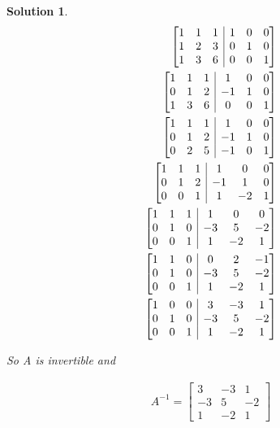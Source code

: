 \documentclass{article}
\newtheorem*{solution}{Solution}
\begin{document}
\begin{solution}
\begin{align*}
\left[ \begin{array}{@{}ccc|ccc@{}}
1 & 1 & 1 & 1 & 0 & 0 \\
1 & 2 & 3 & 0 & 1 & 0 \\
1 & 3 & 6 & 0 & 0 & 1
\end{array} \right] \\
\left[ \begin{array}{@{}ccc|ccc@{}}
1 & 1 & 1 & 1 & 0 & 0 \\
0 & 1 & 2 & -1 & 1 & 0 \\
1 & 3 & 6 & 0 & 0 & 1
\end{array} \right] \\
\left[ \begin{array}{@{}ccc|ccc@{}}
1 & 1 & 1 & 1 & 0 & 0 \\
0 & 1 & 2 & -1 & 1 & 0 \\
0 & 2 & 5 & -1 & 0 & 1
\end{array} \right] \\
\left[ \begin{array}{@{}ccc|ccc@{}}
1 & 1 & 1 & 1 & 0 & 0 \\
0 & 1 & 2 & -1 & 1 & 0 \\
0 & 0 & 1 & 1 & -2 & 1
\end{array} \right] \\
\left[ \begin{array}{@{}ccc|ccc@{}}
1 & 1 & 1 & 1 & 0 & 0 \\
0 & 1 & 0 & -3 & 5 & -2 \\
0 & 0 & 1 & 1 & -2 & 1
\end{array} \right] \\
\left[ \begin{array}{@{}ccc|ccc@{}}
1 & 1 & 0 & 0 & 2 & -1 \\
0 & 1 & 0 & -3 & 5 & -2 \\
0 & 0 & 1 & 1 & -2 & 1
\end{array} \right] \\
\left[ \begin{array}{@{}ccc|ccc@{}}
1 & 0 & 0 & 3 & -3 & 1 \\
0 & 1 & 0 & -3 & 5 & -2 \\
0 & 0 & 1 & 1 & -2 & 1
\end{array} \right] \\
\end{align*}

So A is invertible and 

\begin{align*}
A^{-1} = \begin{bmatrix}
3 & -3 & 1 \\
-3 & 5 & -2 \\
1 & -2 & 1
\end{bmatrix}
\end{align*}


\end{solution}
\end{document}

